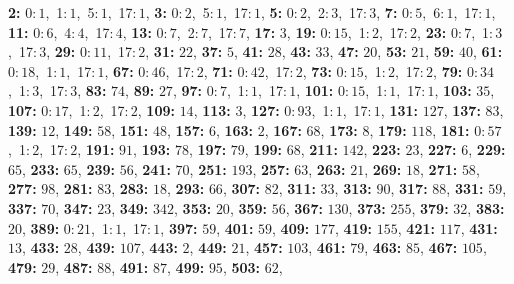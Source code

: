\textsf{\bfseries 2:} 0:\,$1$,\ 1:\,$1$,\ 5:\,$1$,\ 17:\,$1$, \textsf{\bfseries 3:} 0:\,$2$,\ 5:\,$1$,\ 17:\,$1$, \textsf{\bfseries 5:} 0:\,$2$,\ 2:\,$3$,\ 17:\,$3$, \textsf{\bfseries 7:} 0:\,$5$,\ 6:\,$1$,\ 17:\,$1$, \textsf{\bfseries 11:} 0:\,$6$,\ 4:\,$4$,\ 17:\,$4$, \textsf{\bfseries 13:} 0:\,$7$,\ 2:\,$7$,\ 17:\,$7$, \textsf{\bfseries 17:} $3$, \textsf{\bfseries 19:} 0:\,$15$,\ 1:\,$2$,\ 17:\,$2$, \textsf{\bfseries 23:} 0:\,$7$,\ 1:\,$3$,\ 17:\,$3$, \textsf{\bfseries 29:} 0:\,$11$,\ 17:\,$2$, \textsf{\bfseries 31:} $22$, \textsf{\bfseries 37:} $5$, \textsf{\bfseries 41:} $28$, \textsf{\bfseries 43:} $33$, \textsf{\bfseries 47:} $20$, \textsf{\bfseries 53:} $21$, \textsf{\bfseries 59:} $40$, \textsf{\bfseries 61:} 0:\,$18$,\ 1:\,$1$,\ 17:\,$1$, \textsf{\bfseries 67:} 0:\,$46$,\ 17:\,$2$, \textsf{\bfseries 71:} 0:\,$42$,\ 17:\,$2$, \textsf{\bfseries 73:} 0:\,$15$,\ 1:\,$2$,\ 17:\,$2$, \textsf{\bfseries 79:} 0:\,$34$,\ 1:\,$3$,\ 17:\,$3$, \textsf{\bfseries 83:} $74$, \textsf{\bfseries 89:} $27$, \textsf{\bfseries 97:} 0:\,$7$,\ 1:\,$1$,\ 17:\,$1$, \textsf{\bfseries 101:} 0:\,$15$,\ 1:\,$1$,\ 17:\,$1$, \textsf{\bfseries 103:} $35$, \textsf{\bfseries 107:} 0:\,$17$,\ 1:\,$2$,\ 17:\,$2$, \textsf{\bfseries 109:} $14$, \textsf{\bfseries 113:} $3$, \textsf{\bfseries 127:} 0:\,$93$,\ 1:\,$1$,\ 17:\,$1$, \textsf{\bfseries 131:} $127$, \textsf{\bfseries 137:} $83$, \textsf{\bfseries 139:} $12$, \textsf{\bfseries 149:} $58$, \textsf{\bfseries 151:} $48$, \textsf{\bfseries 157:} $6$, \textsf{\bfseries 163:} $2$, \textsf{\bfseries 167:} $68$, \textsf{\bfseries 173:} $8$, \textsf{\bfseries 179:} $118$, \textsf{\bfseries 181:} 0:\,$57$,\ 1:\,$2$,\ 17:\,$2$, \textsf{\bfseries 191:} $91$, \textsf{\bfseries 193:} $78$, \textsf{\bfseries 197:} $79$, \textsf{\bfseries 199:} $68$, \textsf{\bfseries 211:} $142$, \textsf{\bfseries 223:} $23$, \textsf{\bfseries 227:} $6$, \textsf{\bfseries 229:} $65$, \textsf{\bfseries 233:} $65$, \textsf{\bfseries 239:} $56$, \textsf{\bfseries 241:} $70$, \textsf{\bfseries 251:} $193$, \textsf{\bfseries 257:} $63$, \textsf{\bfseries 263:} $21$, \textsf{\bfseries 269:} $18$, \textsf{\bfseries 271:} $58$, \textsf{\bfseries 277:} $98$, \textsf{\bfseries 281:} $83$, \textsf{\bfseries 283:} $18$, \textsf{\bfseries 293:} $66$, \textsf{\bfseries 307:} $82$, \textsf{\bfseries 311:} $33$, \textsf{\bfseries 313:} $90$, \textsf{\bfseries 317:} $88$, \textsf{\bfseries 331:} $59$, \textsf{\bfseries 337:} $70$, \textsf{\bfseries 347:} $23$, \textsf{\bfseries 349:} $342$, \textsf{\bfseries 353:} $20$, \textsf{\bfseries 359:} $56$, \textsf{\bfseries 367:} $130$, \textsf{\bfseries 373:} $255$, \textsf{\bfseries 379:} $32$, \textsf{\bfseries 383:} $20$, \textsf{\bfseries 389:} 0:\,$21$,\ 1:\,$1$,\ 17:\,$1$, \textsf{\bfseries 397:} $59$, \textsf{\bfseries 401:} $59$, \textsf{\bfseries 409:} $177$, \textsf{\bfseries 419:} $155$, \textsf{\bfseries 421:} $117$, \textsf{\bfseries 431:} $13$, \textsf{\bfseries 433:} $28$, \textsf{\bfseries 439:} $107$, \textsf{\bfseries 443:} $2$, \textsf{\bfseries 449:} $21$, \textsf{\bfseries 457:} $103$, \textsf{\bfseries 461:} $79$, \textsf{\bfseries 463:} $85$, \textsf{\bfseries 467:} $105$, \textsf{\bfseries 479:} $29$, \textsf{\bfseries 487:} $88$, \textsf{\bfseries 491:} $87$, \textsf{\bfseries 499:} $95$, \textsf{\bfseries 503:} $62$, 